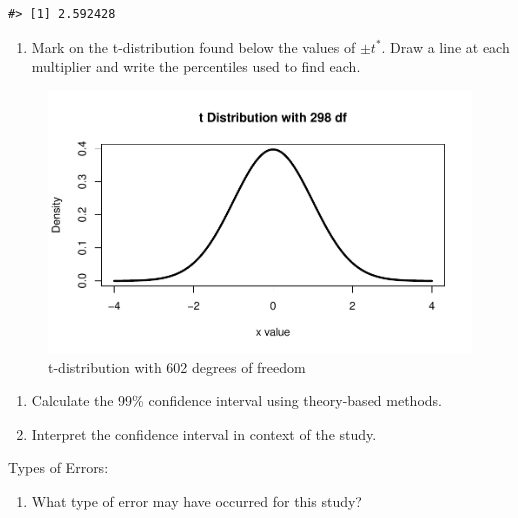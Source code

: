 \documentclass[
]{report}
\providecommand{\tightlist}{%
  \setlength{\itemsep}{0pt}\setlength{\parskip}{0pt}}
\begin{document}
\begin{verbatim}
#> [1] 2.592428
\end{verbatim}

\begin{enumerate}
\def\labelenumi{\arabic{enumi}.}
\setcounter{enumi}{4}
\tightlist
\item
  Mark on the t-distribution found below the values of \(\pm t^*\). Draw a line at each multiplier and write the percentiles used to find each.
  \vspace{1mm}
\end{enumerate}

\begin{figure}

{\centering \includegraphics[width=0.7\linewidth]{10-UR-module7_review_files/figure-latex/tstarmean-1} 

}

\caption{t-distribution with 602 degrees of freedom}\label{fig:tstarmean}
\end{figure}

\begin{enumerate}
\def\labelenumi{\arabic{enumi}.}
\setcounter{enumi}{5}
\item
  Calculate the 99\% confidence interval using theory-based methods.
  \vspace{1in}
\item
  Interpret the confidence interval in context of the study.
\end{enumerate}

\vspace{1in}

\newpage

Types of Errors:

\vspace{3.5in}

\begin{enumerate}
\def\labelenumi{\arabic{enumi}.}
\setcounter{enumi}{7}
\tightlist
\item
  What type of error may have occurred for this study?
\end{enumerate}
\end{document}
